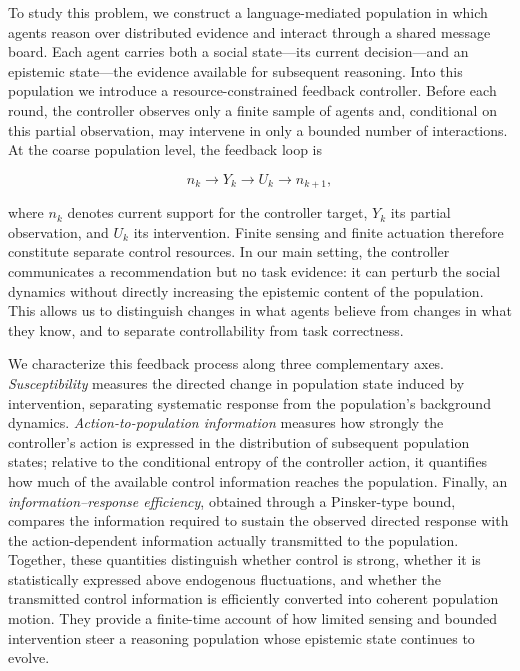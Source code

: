 To study this problem, we construct a language-mediated population in which agents
reason over distributed evidence and interact through a shared message board. Each
agent carries both a social state---its current decision---and an epistemic
state---the evidence available for subsequent reasoning. Into this population we
introduce a resource-constrained feedback controller. Before each round, the
controller observes only a finite sample of agents and, conditional on this partial
observation, may intervene in only a bounded number of interactions. At the coarse
population level, the feedback loop is

\begin{equation}
    n_k \longrightarrow Y_k \longrightarrow U_k \longrightarrow n_{k+1},
\end{equation}

where $n_k$ denotes current support for the controller target, $Y_k$ its partial
observation, and $U_k$ its intervention. Finite sensing and finite actuation therefore
constitute separate control resources. In our main setting, the controller
communicates a recommendation but no task evidence: it can perturb the social
dynamics without directly increasing the epistemic content of the population. This
allows us to distinguish changes in what agents believe from changes in what they
know, and to separate controllability from task correctness.

We characterize this feedback process along three complementary axes.
\emph{Susceptibility} measures the directed change in population state induced by
intervention, separating systematic response from the population's background
dynamics. \emph{Action-to-population information} measures how strongly the
controller's action is expressed in the distribution of subsequent population
states; relative to the conditional entropy of the controller action, it quantifies
how much of the available control information reaches the population. Finally, an
\emph{information--response efficiency}, obtained through a Pinsker-type bound,
compares the information required to sustain the observed directed response with the
action-dependent information actually transmitted to the population. Together,
these quantities distinguish whether control is strong, whether it is statistically
expressed above endogenous fluctuations, and whether the transmitted control
information is efficiently converted into coherent population motion. They provide
a finite-time account of how limited sensing and bounded intervention steer a
reasoning population whose epistemic state continues to evolve.
